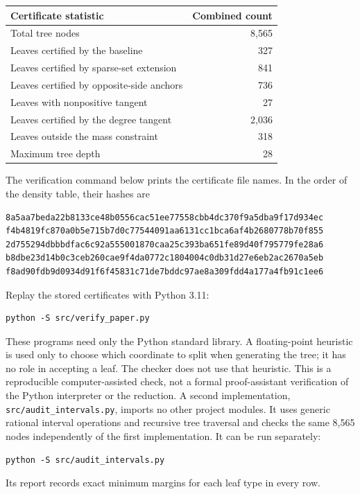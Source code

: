 \documentclass[12pt]{article}
\begin{document}
\begin{center}
\begin{tabular}{lr}
\toprule
Certificate statistic & Combined count\\
\midrule
Total tree nodes & 8,565\\
Leaves certified by the baseline & 327\\
Leaves certified by sparse-set extension & 841\\
Leaves certified by opposite-side anchors & 736\\
Leaves with nonpositive tangent & 27\\
Leaves certified by the degree tangent & 2,036\\
Leaves outside the mass constraint & 318\\
Maximum tree depth & 28\\
\bottomrule
\end{tabular}
\end{center}
The verification command below prints the certificate file names.
In the order of the density table, their hashes are
\begin{lstlisting}
8a5aa7beda22b8133ce48b0556cac51ee77558cbb4dc370f9a5dba9f17d934ec
f4b4819fc870a0b5e715b7d0c77544091aa6131cc1bca6af4b2680778b70f855
2d755294dbbbdfac6c92a555001870caa25c393ba651fe89d40f795779fe28a6
b8dbe23d14b0c3ceb260cae9f4da0772c1804004c0db31d27e6eb2ac2670a5eb
f8ad90fdb9d0934d91f6f45831c71de7bddc97ae8a309fdd4a177a4fb91c1ee6
\end{lstlisting}
Replay the stored certificates with Python 3.11:
\begin{lstlisting}
python -S src/verify_paper.py
\end{lstlisting}
These programs need only the Python standard library. A floating-point
heuristic is used only to choose which coordinate to split when generating
the tree; it has no role in accepting a leaf. The checker does not use that
heuristic. This is a reproducible computer-assisted check, not a formal
proof-assistant verification of the Python interpreter or the reduction.
A second implementation, \texttt{src/audit\_intervals.py}, imports no
other project modules. It uses generic rational interval operations and
recursive tree traversal and checks the same 8,565 nodes independently
of the first implementation. It can be run separately:
\begin{lstlisting}
python -S src/audit_intervals.py
\end{lstlisting}
Its report records exact minimum margins for each leaf type in every row.
\end{document}
